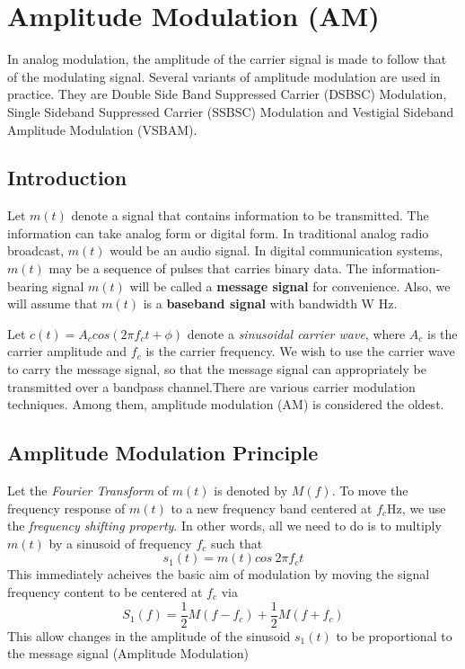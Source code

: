 \section{Amplitude Modulation (AM)}
In analog modulation, the amplitude of the carrier signal is made to follow that of the modulating signal. Several variants of amplitude modulation are used in practice. They are Double Side Band Suppressed Carrier (DSBSC) Modulation, Single Sideband Suppressed Carrier (SSBSC) Modulation and Vestigial Sideband Amplitude Modulation (VSBAM).

\subsection{Introduction}
Let $m(t)$ denote a signal that contains information to be transmitted. The information can take analog form or digital form. In traditional analog radio broadcast, $m(t)$ would be an audio signal. In digital communication systems, $m(t)$ may be a sequence of pulses that carries binary data. The information-bearing signal $m(t)$ will be called a \textbf{message signal} for convenience. Also, we will assume that $m(t)$ is a \textbf{baseband signal} with bandwidth W Hz.

Let $ c(t) = A_c cos(2\pi f_c t + \phi)$ denote a \textit{sinusoidal carrier wave}, where $A_c$ is the carrier amplitude and $f_c$ is the carrier frequency. We wish to use the carrier wave to carry the message signal, so that the message signal can appropriately be transmitted over a bandpass channel.There are various carrier modulation techniques. Among them, amplitude modulation (AM) is considered the oldest.

\subsection{Amplitude Modulation Principle}
Let the \textit{Fourier Transform} of $m(t)$ is denoted by $M(f)$. To move the frequency response of $m(t)$ to a new frequency band centered at $f_c$Hz, we use the \textit{frequency shifting property}. In other words, all we need to do is to multiply $m(t)$ by a sinusoid of frequency $f_c$ such that
\begin{equation*}
    s_1 (t) = m(t)cos ~ 2\pi f_c t
\end{equation*}
This immediately acheives the basic aim of modulation by moving the signal frequency content to be centered at $f_c$ via
\begin{equation*}
  S_1 (f) =\frac{1}{2} M(f - f_c) + \frac{1}{2} M(f + f_c)
\end{equation*}
This allow changes in the amplitude of the sinusoid $s_1(t)$ to be proportional to the message signal (Amplitude Modulation)

